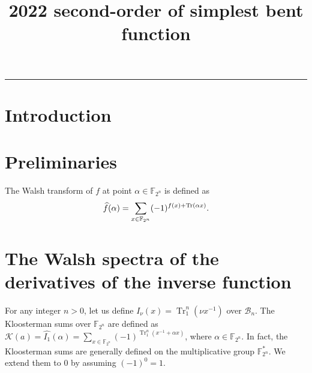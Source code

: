 \documentclass{article}
\title{ 2022 second-order of simplest \mathcal{PS} bent function}
\newcommand{\F}{\mathbb{F}}
\newcommand{\TrN}{\operatorname{Tr}_1^n}
\newtheorem{lemma}{Lemma}
\theoremstyle{nonumberplain}
\newcommand{\0}{\textbf{0}}
\newcommand{\1}{\textbf{1}}
\newcommand{\B}{\mathcal{B}}
\begin{document}
  \noindent
  \rule{\linewidth}{0.4pt}


  \section{Introduction}

\section{Preliminaries}
The Walsh transform of $f$ at point $\alpha \in \F_{2^n}$ is defined as
\begin{equation*}
\widehat{f}(\alpha)=\sum_{x \in \F_{2^n}}(-1)^{f(x)+\Tr(\alpha x)}.
\end{equation*}




\section{The Walsh spectra of the derivatives of the inverse function}

For any integer $n>0$, let us define $I_\nu(x)=\TrN(\nu x^{-1})$ over $\B_n$.
The Kloosterman sums over $\F_{2^n}$ are defined as
$\mathcal{K}(a)=\widehat{I_1}(\alpha)=\sum_{x\in\F_{2^n}}(-1)^{\TrN(x^{-1}+\alpha x)}$, where $\alpha\in\F_{2^n}$.
In fact, the Kloosterman sums are generally defined on the multiplicative
group $\F_{2^n}^*$. We extend them to $0$ by assuming $(-1)^0=1$.
\end{document}
